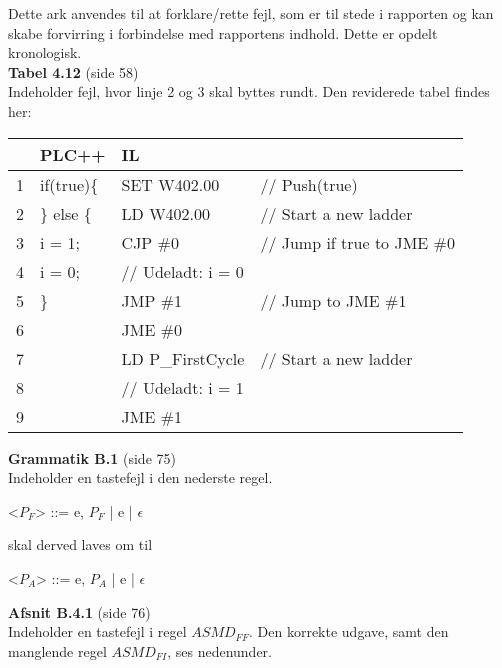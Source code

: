 \documentclass[a4paper,11pt,twoside]{report}
\begin{document}
\noindent Dette ark anvendes til at forklare/rette fejl, som er til stede i rapporten og kan skabe forvirring i forbindelse med rapportens indhold. Dette er opdelt kronologisk.\\

\noindent \textbf{Tabel 4.12} (side 58)\\
\noindent Indeholder fejl, hvor linje 2 og 3 skal byttes rundt. Den reviderede tabel findes her: 

\begin{table}[H]
    \centering\ttfamily
    \begin{tabular}{l|l|l l}
         &PLC++                 & IL \\\hline
        1&if(true)\{            & SET W402.00       &// Push(true)\\
        2&\} else \{            & LD W402.00        &// Start a new ladder\\
        3&  i = 1;              & CJP \#0           &// Jump if true to JME \#0\\
        4&  i = 0;              & // Udeladt: i = 0\\
        5& \}                   & JMP \#1           &// Jump to JME \#1\\
        6&                      & JME \#0           &\\
        7&                      & LD P\_FirstCycle  &// Start a new ladder\\
        8&                      & // Udeladt: i = 1\\
        9&                      & JME \#1
    \end{tabular}
\end{table}

\noindent \textbf{Grammatik B.1} (side 75)\\
\noindent Indeholder en tastefejl i den nederste regel.

\begin{grammar}
   <$P_F$> ::= e, $P_F$ | e | $\epsilon$
\end{grammar}

\noindent skal derved laves om til 

\begin{grammar}
   <$P_A$> ::= e, $P_A$ | e | $\epsilon$
\end{grammar}

\noindent \textbf{Afsnit B.4.1} (side 76)\\
\noindent Indeholder en tastefejl i regel $ASMD_{FF}$. Den korrekte udgave, samt den manglende regel $ASMD_{FI}$, ses nedenunder.
\end{document}
